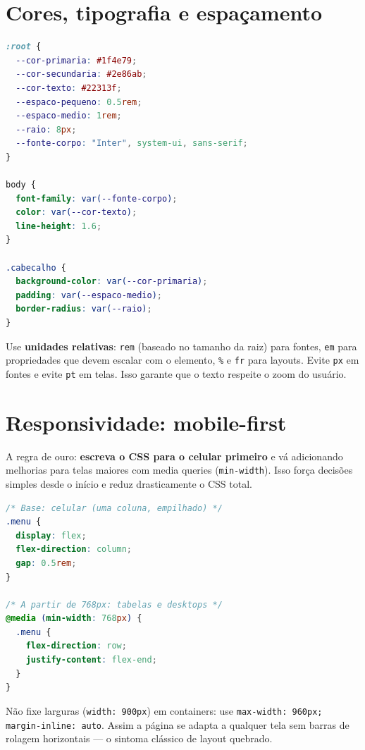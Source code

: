 \section{Cores, tipografia e espaçamento}

\begin{lstlisting}[style=livro, language=CSS,
  caption={Sistema de design com variáveis CSS.}, label={list:css-variaveis}]
:root {
  --cor-primaria: #1f4e79;
  --cor-secundaria: #2e86ab;
  --cor-texto: #22313f;
  --espaco-pequeno: 0.5rem;
  --espaco-medio: 1rem;
  --raio: 8px;
  --fonte-corpo: "Inter", system-ui, sans-serif;
}

body {
  font-family: var(--fonte-corpo);
  color: var(--cor-texto);
  line-height: 1.6;
}

.cabecalho {
  background-color: var(--cor-primaria);
  padding: var(--espaco-medio);
  border-radius: var(--raio);
}
\end{lstlisting}

\begin{caixadica}
Use \textbf{unidades relativas}: \texttt{rem} (baseado no tamanho da raiz) para
fontes, \texttt{em} para propriedades que devem escalar com o elemento,
\texttt{\%} e \texttt{fr} para layouts. Evite \texttt{px} em fontes e evite
\texttt{pt} em telas. Isso garante que o texto respeite o zoom do usuário.
\end{caixadica}

\section{Responsividade: mobile-first}

A regra de ouro: \textbf{escreva o CSS para o celular primeiro} e vá
adicionando melhorias para telas maiores com media queries
(\texttt{min-width}). Isso força decisões simples desde o início e reduz
drasticamente o CSS total.

\begin{lstlisting}[style=livro, language=CSS,
  caption={Estratégia mobile-first com media query.}, label={list:css-media}]
/* Base: celular (uma coluna, empilhado) */
.menu {
  display: flex;
  flex-direction: column;
  gap: 0.5rem;
}

/* A partir de 768px: tabelas e desktops */
@media (min-width: 768px) {
  .menu {
    flex-direction: row;
    justify-content: flex-end;
  }
}
\end{lstlisting}

\begin{caixaarmadilha}
Não fixe larguras (\texttt{width: 900px}) em containers: use
\texttt{max-width: 960px; margin-inline: auto}. Assim a página se adapta a
qualquer tela sem barras de rolagem horizontais — o sintoma clássico de layout
quebrado.
\end{caixaarmadilha}

